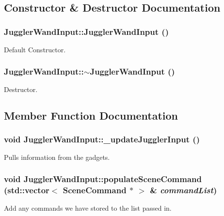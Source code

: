 \subsection{Constructor \& Destructor Documentation}
\hypertarget{class_juggler_wand_input_a54955ec4b9b37ac6abee74d03632c90e}{
\subsubsection[{JugglerWandInput}]{\setlength{\rightskip}{0pt plus 5cm}JugglerWandInput::JugglerWandInput ()}}
\label{class_juggler_wand_input_a54955ec4b9b37ac6abee74d03632c90e}
Default Constructor. \hypertarget{class_juggler_wand_input_ad43caebd3f105e42091d2822e3ccfd3b}{
\subsubsection[{$\sim$JugglerWandInput}]{\setlength{\rightskip}{0pt plus 5cm}JugglerWandInput::$\sim$JugglerWandInput ()}}
\label{class_juggler_wand_input_ad43caebd3f105e42091d2822e3ccfd3b}
Destructor. 

\subsection{Member Function Documentation}
\hypertarget{class_juggler_wand_input_af3e82f8e0484d2264676cdaafee04f32}{
\subsubsection[{\_\-updateJugglerInput}]{\setlength{\rightskip}{0pt plus 5cm}void JugglerWandInput::\_\-updateJugglerInput ()}}
\label{class_juggler_wand_input_af3e82f8e0484d2264676cdaafee04f32}
Pulls information from the gadgets. \hypertarget{class_juggler_wand_input_a189d0680740c8755abc38b841de34130}{
\subsubsection[{populateSceneCommand}]{\setlength{\rightskip}{0pt plus 5cm}void JugglerWandInput::populateSceneCommand (std::vector$<$ {\bf SceneCommand} $\ast$ $>$ \& {\em commandList})}}
\label{class_juggler_wand_input_a189d0680740c8755abc38b841de34130}
Add any commands we have stored to the list passed in. 

